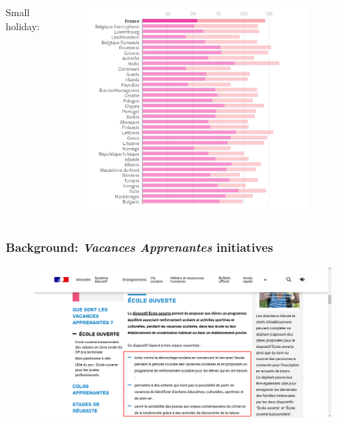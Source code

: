 \documentclass[10pt,mathserif,aspectratio=169]{beamer}
\begin{document}
\begin{frame}[label=background1]
\begin{columns}[T,onlytextwidth]
    Small holiday:
    \begin{figure}
      \centering
      \includegraphics[width=0.9\textwidth]{../Figures/holiday_petites.png}
    \end{figure}
  \end{columns}
\end{frame}

\begin{frame}[label=background2]
  \frametitle{Background: \textit{Vacances Apprenantes} initiatives}
  \begin{figure}
    \centering
    \includegraphics[width=\textwidth]{../Figures/vacancesapprenantes.png}
  \end{figure}
\end{frame}
\end{document}
